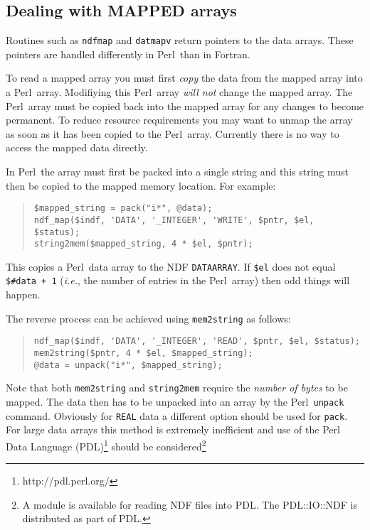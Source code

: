 \documentclass[twoside,11pt]{article}
\newenvironment{myquote}{\begin{quote}\begin{small}}{\end{small}\end{quote}}
\newcommand{\perl}{\xref{\textsf{Perl}}{sun193}{}}
\newcommand{\htmladdnormallinkfoot}[2]{#1\footnote{#2}}
\newcommand{\xref}[3]{#1}
\newcommand{\xlabel}[1]{}
\renewcommand{\_}{\texttt{\symbol{95}}}
\begin{document}
\subsection{\xlabel{dealing_with_mapped_arrays}Dealing with MAPPED arrays}%
\label{dealing_with_mapped_arrays}

Routines such as \texttt{ndf\_map} and \texttt{dat\_mapv} return
pointers to the data arrays. These pointers are handled differently in
\perl\ than in Fortran.

To read a mapped array you must first \emph{copy\/} the data from the mapped
array into a \perl\ array. Modifiying this \perl\ array \emph{will not\/} change
the mapped array. The \perl\ array must be copied back into the mapped
array for any changes to become permanent. To reduce resource requirements
you may want to unmap the array as soon as it has been copied to the
\perl\ array. Currently there is no way to access the mapped data directly.

In \perl\ the array must first be packed into a single string and this
string must then be copied to the mapped memory location.
For example:

\begin{myquote}
\begin{verbatim}
$mapped_string = pack("i*", @data);
ndf_map($indf, 'DATA', '_INTEGER', 'WRITE', $pntr, $el, $status);
string2mem($mapped_string, 4 * $el, $pntr);
\end{verbatim}
\end{myquote}

This copies a \perl\ data array to the NDF \texttt{DATA\_ARRAY}. If
\texttt{\$el} does not equal \texttt{\$\#data + 1} (\emph{i.e.}, the
number of entries in the \perl\ array) then odd things will happen.

The reverse process can be achieved using \texttt{mem2string} as follows:

\begin{myquote}
\begin{verbatim}
ndf_map($indf, 'DATA', '_INTEGER', 'READ', $pntr, $el, $status);
mem2string($pntr, 4 * $el, $mapped_string);
@data = unpack("i*", $mapped_string);
\end{verbatim}
\end{myquote}

Note that both \texttt{mem2string} and \texttt{string2mem} require the
\emph{number of bytes\/} to be mapped.  The data then has to be
unpacked into an array by the \perl\ \texttt{unpack} command. Obviously
for \texttt{\_REAL} data a different option should be used for
\texttt{pack}.  For large data arrays this method is extremely
inefficient and use of the \htmladdnormallinkfoot{Perl Data Language
(PDL)}{http://pdl.perl.org/} should be
considered\footnote{A module is available for reading NDF files into
PDL. The PDL::IO::NDF is distributed as part of PDL.}
\end{document}
